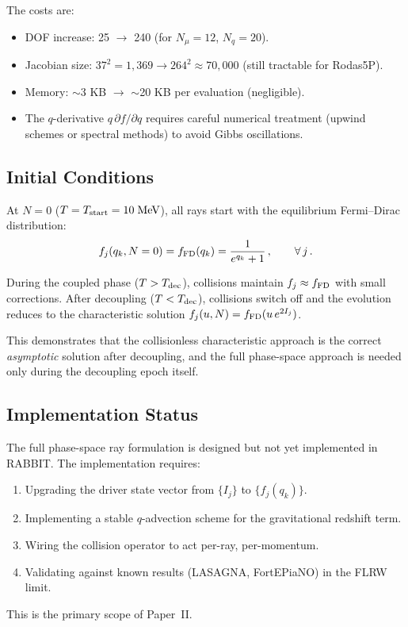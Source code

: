 The costs are:
\begin{itemize}
\item DOF increase: 25 $\to$ 240 (for $N_\mu = 12$, $N_q = 20$).
\item Jacobian size: $37^2 = 1{,}369 \to 264^2 \approx 70{,}000$ (still tractable for Rodas5P).
\item Memory: $\sim$3 KB $\to$ $\sim$20 KB per evaluation (negligible).
\item The $q$-derivative $q\,\partial f/\partial q$ requires careful numerical treatment (upwind schemes or spectral methods) to avoid Gibbs oscillations.
\end{itemize}

\subsection{Initial Conditions}

At $N = 0$ ($T = T_{\rm start} = 10\;\mathrm{MeV}$), all rays start with the equilibrium Fermi--Dirac distribution:
\begin{equation}
f_j(q_k, N=0) = f_{\rm FD}(q_k) = \frac{1}{e^{q_k} + 1}\,,\qquad \forall\,j\,.
\end{equation}

During the coupled phase ($T > T_{\rm dec}$), collisions maintain $f_j \approx f_{\rm FD}$ with small corrections.  After decoupling ($T < T_{\rm dec}$), collisions switch off and the evolution reduces to the characteristic solution $f_j(u, N) = f_{\rm FD}(u\,e^{2I_j})$.

This demonstrates that the collisionless characteristic approach is the correct \emph{asymptotic} solution after decoupling, and the full phase-space approach is needed only during the decoupling epoch itself.

\subsection{Implementation Status}

The full phase-space ray formulation is designed but not yet implemented in RABBIT.  The implementation requires:
\begin{enumerate}
\item Upgrading the driver state vector from $\{I_j\}$ to $\{f_j(q_k)\}$.
\item Implementing a stable $q$-advection scheme for the gravitational redshift term.
\item Wiring the collision operator to act per-ray, per-momentum.
\item Validating against known results (LASAGNA, FortEPiaNO) in the FLRW limit.
\end{enumerate}

This is the primary scope of Paper~II.

